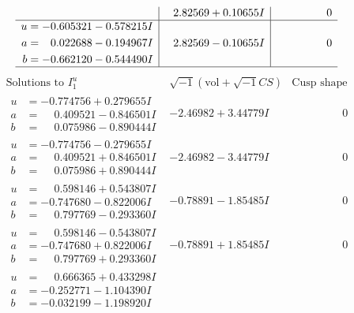 \documentclass[1p]{elsarticle_modified}
\theoremstyle{definition}
\newcommand{\I}{\sqrt{-1}}
\begin{document}
$$\begin{array}{c|c|c}
 & \phantom{-}2.82569 + 0.10655 I & \phantom{-0.000000 } 0 \\ \hline\begin{aligned}
u &= -0.605321 - 0.578215 I \\
a &= \phantom{-}0.022688 - 0.194967 I \\
b &= -0.662120 - 0.544490 I\end{aligned}
 & \phantom{-}2.82569 - 0.10655 I & \phantom{-0.000000 } 0\\
 \hline 
 \end{array}$$\newpage$$\begin{array}{c|c|c}  
\text{Solutions to }I^u_{1}& \I (\text{vol} + \sqrt{-1}CS) & \text{Cusp shape}\\
 \hline 
\begin{aligned}
u &= -0.774756 + 0.279655 I \\
a &= \phantom{-}0.409521 - 0.846501 I \\
b &= \phantom{-}0.075986 - 0.890444 I\end{aligned}
 & -2.46982 + 3.44779 I & \phantom{-0.000000 } 0 \\ \hline\begin{aligned}
u &= -0.774756 - 0.279655 I \\
a &= \phantom{-}0.409521 + 0.846501 I \\
b &= \phantom{-}0.075986 + 0.890444 I\end{aligned}
 & -2.46982 - 3.44779 I & \phantom{-0.000000 } 0 \\ \hline\begin{aligned}
u &= \phantom{-}0.598146 + 0.543807 I \\
a &= -0.747680 - 0.822006 I \\
b &= \phantom{-}0.797769 - 0.293360 I\end{aligned}
 & -0.78891 - 1.85485 I & \phantom{-0.000000 } 0 \\ \hline\begin{aligned}
u &= \phantom{-}0.598146 - 0.543807 I \\
a &= -0.747680 + 0.822006 I \\
b &= \phantom{-}0.797769 + 0.293360 I\end{aligned}
 & -0.78891 + 1.85485 I & \phantom{-0.000000 } 0 \\ \hline\begin{aligned}
u &= \phantom{-}0.666365 + 0.433298 I \\
a &= -0.252771 - 1.104390 I \\
b &= -0.032199 - 1.198920 I\end{aligned}

\end{array}$$
\end{document}
